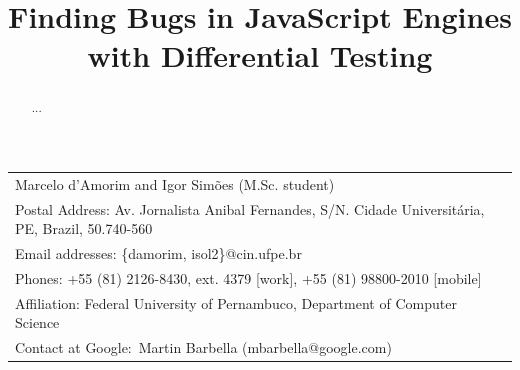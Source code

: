 \documentclass[11pt]{article}
\begin{document}
\title{Finding Bugs in JavaScript Engines with Differential Testing}
\author{}
\date{}


\makeatletter
\def\maketitle{%
  \par{\centering\large\textbf{\@title}\normalsize\par}\vspace{3ex}%
  \par{\@author}%
  \par}
\makeatother

\maketitle

\vspace{-2ex}
\small    
\begin{table}[h!] 
  \centering%
  \begin{tabular*}{.85\linewidth}{l}

    Marcelo d'Amorim and Igor Sim\~oes (M.Sc. student)\\
    
    Postal Address: Av. Jornalista Anibal Fernandes, S/N. Cidade
    Universit\'aria, PE, Brazil, 50.740-560 \\
    
    Email addresses: \{damorim, isol2\}@cin.ufpe.br\\

    Phones: +55 (81) 2126-8430,
    ext. 4379 [work], +55 (81) 98800-2010 [mobile]\\

    Affiliation: Federal University of Pernambuco, Department of
    Computer Science\\

    Contact at Google:~Martin Barbella (mbarbella@google.com)

  \end{tabular*}
\end{table}
\normalsize

\vspace{-2ex}
\begin{abstract}
...
\end{abstract}
\end{document}
